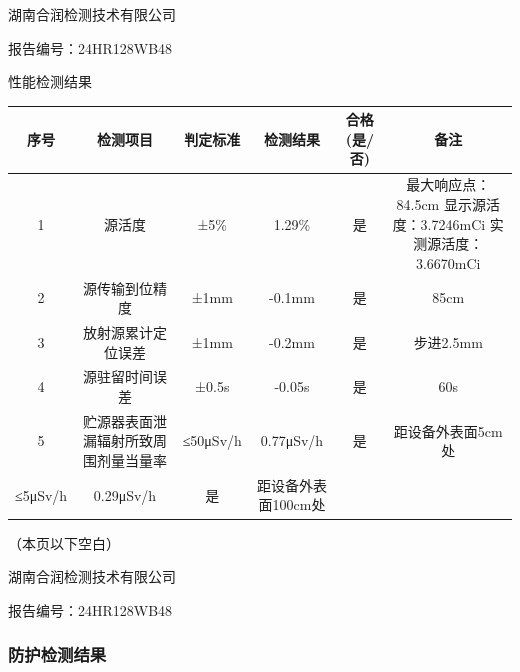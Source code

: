 湖南合润检测技术有限公司

报告编号：24HR128WB48

性能检测结果

\begin{table}[H]
\centering
\begin{tabular}{|c|c|c|c|c|c|}
\hline
序号 & 检测项目 & 判定标准 & 检测结果 & 合格 (是/否) & 备注 \\
\hline
1 & 源活度 & ±5\% & 1.29\% & 是 & 最大响应点：84.5cm 显示源活度：3.7246mCi 实测源活度：3.6670mCi \\
\hline
2 & 源传输到位精度 & ±1mm & -0.1mm & 是 & 85cm \\
\hline
3 & 放射源累计定位误差 & ±1mm & -0.2mm & 是 & 步进2.5mm \\
\hline
4 & 源驻留时间误差 & ±0.5s & -0.05s & 是 & 60s \\
\hline
5 & 贮源器表面泄漏辐射所致周围剂量当量率 & ≤50μSv/h & 0.77μSv/h & 是 & 距设备外表面5cm处 \\
\hline
≤5μSv/h & 0.29μSv/h & 是 & 距设备外表面100cm处 &  &  \\
\hline
\end{tabular}
\end{table}


（本页以下空白）

湖南合润检测技术有限公司

报告编号：24HR128WB48

\subsubsection{防护检测结果}

